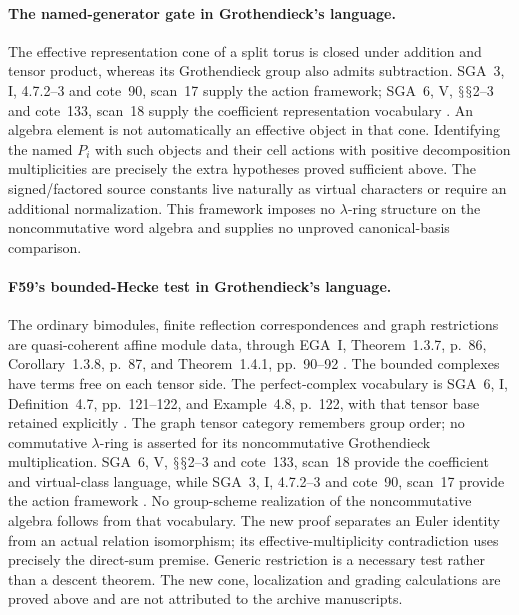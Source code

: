 \documentclass[11pt,a4paper]{article}
\renewcommand{\S}{\ensuremath{\mathsection}}
\newcommand{\fid}[1]{\textsf{#1}}\newcommand{\gate}[1]{\textsf{#1}}
\theoremstyle{named}\newtheorem{finding}{Finding}[section]
\theoremstyle{definition}\newtheorem{definition}[finding]{Definition}
\theoremstyle{remark}\newtheorem{remark}[finding]{Remark}
\begin{document}
\paragraph{The named-generator gate in Grothendieck's language.}
The effective representation cone of a split torus is
closed under addition and tensor product, whereas its
Grothendieck group also admits subtraction.
SGA~3, I, 4.7.2--3 and cote~90, scan~17 supply the
action framework; SGA~6, V, \S\S2--3 and cote~133,
scan~18 supply the coefficient representation
vocabulary \cite{SGA3,SGA6,Archive}.
An algebra element is not automatically an effective
object in that cone. Identifying the named \(P_i\)
with such objects and their cell actions with positive
decomposition multiplicities are precisely the extra
hypotheses proved sufficient above.
The signed/factored source constants live naturally
as virtual characters or require an additional
normalization. This framework imposes no
\(\lambda\)-ring structure on the noncommutative word
algebra and supplies no unproved canonical-basis
comparison.

\paragraph{\fid{F59}'s bounded-Hecke test in Grothendieck's language.}
The ordinary bimodules, finite reflection correspondences
and graph restrictions are quasi-coherent affine module
data, through EGA~I, Theorem~1.3.7, p.~86,
Corollary~1.3.8, p.~87, and Theorem~1.4.1,
pp.~90--92 \cite{EGA}.
The bounded complexes have terms free on each tensor
side. The perfect-complex vocabulary is SGA~6,
I, Definition~4.7, pp.~121--122, and Example~4.8,
p.~122, with that tensor base retained explicitly
\cite{SGA6}.
The graph tensor category remembers group order;
no commutative \(\lambda\)-ring is asserted for its
noncommutative Grothendieck multiplication.
SGA~6, V, \S\S2--3 and cote~133, scan~18 provide
the coefficient and virtual-class language, while
SGA~3, I, 4.7.2--3 and cote~90, scan~17 provide
the action framework \cite{SGA3,SGA6,Archive}.
No group-scheme realization of the noncommutative algebra
follows from that vocabulary.
The new proof separates an Euler identity from an actual
relation isomorphism; its effective-multiplicity
contradiction uses precisely the direct-sum premise.
Generic restriction is a necessary test rather than a
descent theorem. The new cone, localization and grading
calculations are proved above and are not attributed to
the archive manuscripts.
\end{document}
